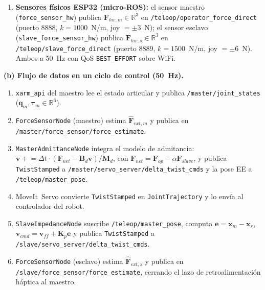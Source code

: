 \documentclass[journal,10pt,twoside]{IEEEtran}
\begin{document}
\begin{enumerate}[label=\roman*.]
        $\hat{\bm{F}}_{ext,s} \in \mathbb{R}^6$ y publica en
        \texttt{/slave/force\_sensor/force\_estimate}, que el nodo
        maestro usa para generar la retroalimentación háptica.
  \item \textbf{Sensores físicos ESP32 (micro-ROS):} el sensor maestro
        (\texttt{force\_sensor\_hw}) publica $\bm{F}_{hw,m}
        \in \mathbb{R}^3$ en \texttt{/teleop/operator\_force\_direct}
        (puerto 8888, $k=1000$~N/m, joy $= \pm3$~N); el sensor esclavo
        (\texttt{slave\_force\_sensor\_hw}) publica
        $\bm{F}_{hw,s} \in \mathbb{R}^3$ en
        \texttt{/teleop/slave\_force\_direct}
        (puerto 8889, $k=1500$~N/m, joy $= \pm6$~N). Ambos a 50~Hz
        con QoS \texttt{BEST\_EFFORT} sobre WiFi.
\end{enumerate}

\textbf{(b) Flujo de datos en un ciclo de control (50~Hz).}
\begin{enumerate}[label=\roman*.]
  \item \texttt{xarm\_api} del maestro lee el estado articular y
        publica \texttt{/master/joint\_states}
        ($\bm{q}_m, \bm{\tau}_m \in \mathbb{R}^6$).
  \item \texttt{ForceSensorNode} (maestro) estima
        $\hat{\bm{F}}_{ext,m}$ y publica en
        \texttt{/master/force\_sensor/force\_estimate}.
  \item \texttt{MasterAdmittanceNode} integra el modelo de admitancia:
        $\bm{v} \mathrel{+}= \Delta t \cdot (\bm{F}_{net} -
        \bm{B}_d\bm{v}) / \bm{M}_d$, con
        $\bm{F}_{net} = \bm{F}_{op} - \alpha\bm{F}_{slave}$,
        y publica \texttt{TwistStamped} a
        \texttt{/master/servo\_server/delta\_twist\_cmds} y
        la pose EE a \texttt{/teleop/master\_pose}.
  \item MoveIt~Servo convierte \texttt{TwistStamped} en
        \texttt{JointTrajectory} y lo envía al controlador del robot.
  \item \texttt{SlaveImpedanceNode} suscribe \texttt{/teleop/master\_pose},
        computa $\bm{e} = \bm{x}_m - \bm{x}_s$,
        $\bm{v}_{cmd} = \bm{v}_{ff} + \bm{K}_p\bm{e}$ y publica
        \texttt{TwistStamped} a
        \texttt{/slave/servo\_server/delta\_twist\_cmds}.
  \item \texttt{ForceSensorNode} (esclavo) estima
        $\hat{\bm{F}}_{ext,s}$ y publica en
        \texttt{/slave/force\_sensor/force\_estimate}, cerrando el
        lazo de retroalimentación háptica al maestro.
\end{enumerate}
\end{document}
